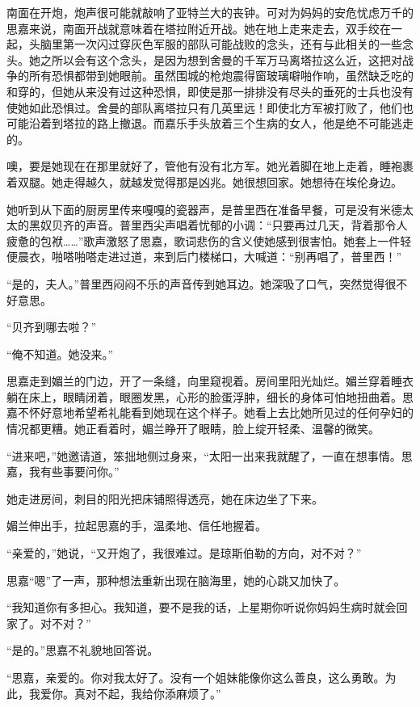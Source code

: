 \par 南面在开炮，炮声很可能就敲响了亚特兰大的丧钟。可对为妈妈的安危忧虑万千的思嘉来说，南面开战就意味着在塔拉附近开战。她在地上走来走去，双手绞在一起，头脑里第一次闪过穿灰色军服的部队可能战败的念头，还有与此相关的一些念头。她之所以会有这个念头，是因为想到舍曼的千军万马离塔拉这么近，这把对战争的所有恐惧都带到她眼前。虽然围城的枪炮震得窗玻璃噼啪作响，虽然缺乏吃的和穿的，但她从来没有过这种恐惧，即使是那一排排没有尽头的垂死的士兵也没有使她如此恐惧过。舍曼的部队离塔拉只有几英里远！即使北方军被打败了，他们也可能沿着到塔拉的路上撤退。而嘉乐手头放着三个生病的女人，他是绝不可能逃走的。
\par 噢，要是她现在在那里就好了，管他有没有北方军。她光着脚在地上走着，睡袍裹着双腿。她走得越久，就越发觉得那是凶兆。她很想回家。她想待在埃伦身边。
\par 她听到从下面的厨房里传来嘎嘎的瓷器声，是普里西在准备早餐，可是没有米德太太的黑奴贝齐的声音。普里西尖声唱着忧郁的小调：“只要再过几天，背着那令人疲惫的包袱……”歌声激怒了思嘉，歌词悲伤的含义使她感到很害怕。她套上一件轻便晨衣，啪嗒啪嗒走进过道，来到后门楼梯口，大喊道：“别再唱了，普里西！”
\par “是的，夫人。”普里西闷闷不乐的声音传到她耳边。她深吸了口气，突然觉得很不好意思。
\par “贝齐到哪去啦？”
\par “俺不知道。她没来。”
\par 思嘉走到媚兰的门边，开了一条缝，向里窥视着。房间里阳光灿烂。媚兰穿着睡衣躺在床上，眼睛闭着，眼圈发黑，心形的脸蛋浮肿，细长的身体可怕地扭曲着。思嘉不怀好意地希望希礼能看到她现在这个样子。她看上去比她所见过的任何孕妇的情况都更糟。她正看着时，媚兰睁开了眼睛，脸上绽开轻柔、温馨的微笑。
\par “进来吧，”她邀请道，笨拙地侧过身来，“太阳一出来我就醒了，一直在想事情。思嘉，我有些事要问你。”
\par 她走进房间，刺目的阳光把床铺照得透亮，她在床边坐了下来。
\par 媚兰伸出手，拉起思嘉的手，温柔地、信任地握着。
\par “亲爱的，”她说，“又开炮了，我很难过。是琼斯伯勒的方向，对不对？”
\par 思嘉“嗯”了一声，那种想法重新出现在脑海里，她的心跳又加快了。
\par “我知道你有多担心。我知道，要不是我的话，上星期你听说你妈妈生病时就会回家了。对不对？”
\par “是的。”思嘉不礼貌地回答说。
\par “思嘉，亲爱的。你对我太好了。没有一个姐妹能像你这么善良，这么勇敢。为此，我爱你。真对不起，我给你添麻烦了。”
